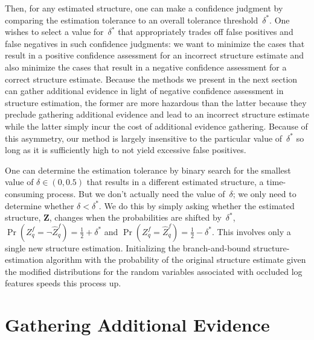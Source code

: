 %
Then, for any estimated structure, one can make a confidence judgment by
comparing the estimation tolerance to an overall tolerance threshold~$\delta^*$.
%
One wishes to select a value for~$\delta^*$ that appropriately trades off false
positives and false negatives in such confidence judgments: we want to
minimize the cases that result in a positive confidence assessment for an
incorrect structure estimate and also minimize the cases that result in a
negative confidence assessment for a correct structure estimate.
%
Because the methods we present in the next section can gather additional
evidence in light of negative confidence assessment in structure estimation,
the former are more hazardous than the latter because they preclude gathering
additional evidence and lead to an incorrect structure estimate while the
latter simply incur the cost of additional evidence gathering.
%
Because of this asymmetry, our method is largely insensitive to the particular
value of~$\delta^*$ so long as it is sufficiently high to not yield excessive
false positives.

One can determine the estimation tolerance by binary search for the smallest
value of $\delta\in(0,0.5)$ that results in a different estimated structure, a
time-consuming process.
%
But we don't actually need the value of~$\delta$; we only need to determine
whether $\delta<\delta^*$.
%
We do this by simply asking whether the estimated structure, $\mathbf{Z}$,
changes when the probabilities are shifted by~$\delta^*$, \ie\
%
\begin{math}
    \Pr(Z^f_q=\neg\hat{Z}^f_q)=\frac{1}{2}+\delta^{*}
\end{math}
and
\begin{math}
    \Pr(Z^f_q=\hat{Z}^f_q)=\frac{1}{2}-\delta^{*}
\end{math}.
%
This involves only a single new structure estimation.
%
Initializing the branch-and-bound structure-estimation algorithm with the
probability of the original structure estimate given the modified distributions
for the random variables associated with occluded log features speeds this
process up.

\par\vspace{-1ex}
\section{Gathering Additional Evidence}
\label{sec:integration}

